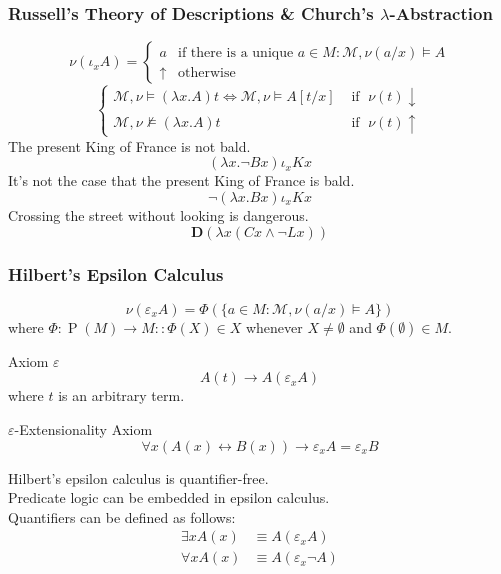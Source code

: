 \documentclass[UTF8,aspectratio=43,11pt,colorlinks,compress,openany]{beamer}%
\begin{document}
\begin{frame}\frametitle{Russell's Theory of Descriptions \& Church's $\lambda$-Abstraction}
\[
\nu(\iota_xA)=
\begin{cases}
	a &\mbox{if there is a unique } a\in M: \mathcal{M},\nu(a/x)\vDash A\\
	\uparrow &\mbox{otherwise}
\end{cases}
\]
\[\begin{cases}
\mathcal{M},\nu\vDash(\lambda x.A)t\iff\mathcal{M},\nu\vDash A[t/x]&\mbox{ if }\; \nu(t)\downarrow\\
\mathcal{M},\nu\nvDash(\lambda x.A)t&\mbox{ if }\; \nu(t)\uparrow
\end{cases}\]
The present King of France is not bald.
\[(\lambda x.\neg Bx)\iota_xKx\]
It's not the case that the present King of France is bald.
\[\neg(\lambda x.Bx)\iota_xKx\]
Crossing the street without looking is dangerous.
\[\mathbf{D}(\lambda x(Cx\wedge\neg Lx))\]
\end{frame}

\begin{frame}\frametitle{Hilbert's Epsilon Calculus}
\[\nu(\varepsilon_x A)=\Phi\left(\{a\in M:\mathcal{M},\nu(a/x)\vDash A\}\right)\]
where $\Phi:\operatorname{P}(M)\to M :: \Phi(X)\in X$ whenever $X\ne\emptyset$ and $\Phi(\emptyset)\in M$.
\begin{block}{Axiom $\varepsilon$}
\[A(t)\to A(\varepsilon_xA)\]
where $t$ is an arbitrary term.
\end{block}
\begin{block}{$\varepsilon$-Extensionality Axiom}
\[\forall x(A(x)\leftrightarrow B(x))\to \varepsilon_xA=\varepsilon_x B\]
\end{block}
Hilbert's epsilon calculus is quantifier-free.\\Predicate logic can be embedded in epsilon calculus.\\
Quantifiers can be defined as follows:
\begin{align*}
\exists x A(x)&\equiv A(\varepsilon_x A)\\
\forall x A(x)&\equiv A(\varepsilon_x\neg A)
\end{align*}
\end{frame}
\end{document}
